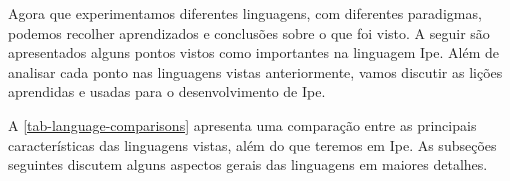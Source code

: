 Agora que experimentamos diferentes linguagens, com diferentes paradigmas, podemos
recolher aprendizados e conclusões sobre o que foi visto. A seguir são apresentados
alguns pontos vistos como importantes na linguagem Ipe. Além de analisar cada ponto
nas linguagens vistas anteriormente, vamos discutir as lições aprendidas e usadas
para o desenvolvimento de Ipe.

A \autoref{tab-language-comparisons} apresenta uma comparação entre as
principais características das linguagens vistas, além do que teremos em Ipe. As
subseções seguintes discutem alguns aspectos gerais das linguagens em maiores detalhes.

\begin{table}[htb]
  \caption{Principais características das linguagens analisadas e de Ipe}
  \label{tab-language-comparisons}
\end{table}


